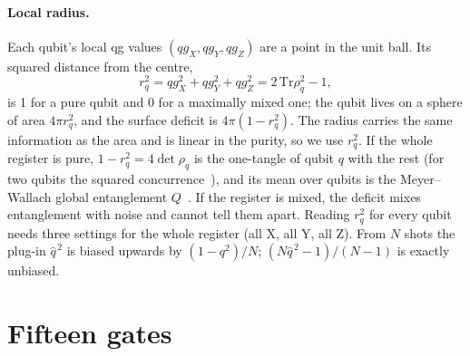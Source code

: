 \documentclass[11pt]{article}
\newcommand{\qZ}{qg_Z}
\newcommand{\qX}{qg_X}
\newcommand{\qY}{qg_Y}
\begin{document}
\paragraph{Local radius.} Each qubit's local qg values $(\qX,\qY,\qZ)$ are a point in the unit ball. Its squared
distance from the centre,
\begin{equation}\label{eq:radius}
r_q^2=\qX^2+\qY^2+\qZ^2=2\,\mathrm{Tr}\rho_q^2-1,
\end{equation}
is 1 for a pure qubit and 0 for a maximally mixed one; the qubit lives on a sphere of area $4\pi r_q^2$, and the
surface deficit is $4\pi(1-r_q^2)$. The radius carries the same information as the area and is linear in the
purity, so we use $r_q^2$. If the whole register is pure, $1-r_q^2=4\det\rho_q$ is the one-tangle of qubit $q$
with the rest (for two qubits the squared concurrence~\cite{wootters1998,coffman2000}), and its mean over qubits is
the Meyer--Wallach global entanglement $Q$~\cite{meyer2002,brennen2003}. If the register is mixed, the deficit mixes
entanglement with noise and cannot tell them apart. Reading $r_q^2$ for every qubit needs three settings for the
whole register (all X, all Y, all Z). From $N$ shots the plug-in $\hat q^{\,2}$ is biased upwards by $(1-q^2)/N$;
$(N\hat q^{\,2}-1)/(N-1)$ is exactly unbiased.

\section{Fifteen gates}
\end{document}
